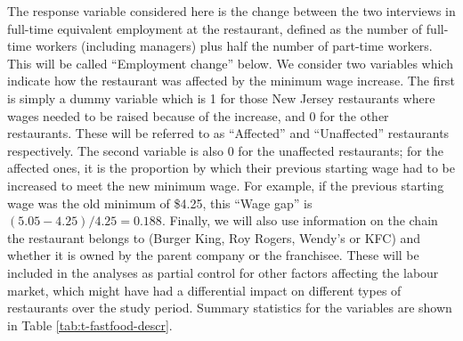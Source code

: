 \documentclass[11pt,a4paper,openany]{book}
\begin{document}
The response variable considered here is the change between the two
interviews in full-time equivalent employment at the restaurant, defined
as the number of full-time workers (including managers) plus half the
number of part-time workers. This will be called ``Employment change''
below. We consider two variables which indicate how the restaurant was
affected by the minimum wage increase. The first is simply a dummy
variable which is 1 for those New Jersey restaurants where wages needed
to be raised because of the increase, and 0 for the other restaurants.
These will be referred to as ``Affected'' and ``Unaffected'' restaurants
respectively. The second variable is also 0 for the unaffected
restaurants; for the affected ones, it is the proportion by which their
previous starting wage had to be increased to meet the new minimum wage.
For example, if the previous starting wage was the old minimum of
\$4.25, this ``Wage gap'' is \((5.05-4.25)/4.25=0.188\). Finally, we
will also use information on the chain the restaurant belongs to (Burger
King, Roy Rogers, Wendy's or KFC) and whether it is owned by the parent
company or the franchisee. These will be included in the analyses as
partial control for other factors affecting the labour market, which
might have had a differential impact on different types of restaurants
over the study period. Summary statistics for the variables are shown in
Table \ref{tab:t-fastfood-descr}.
\end{document}
